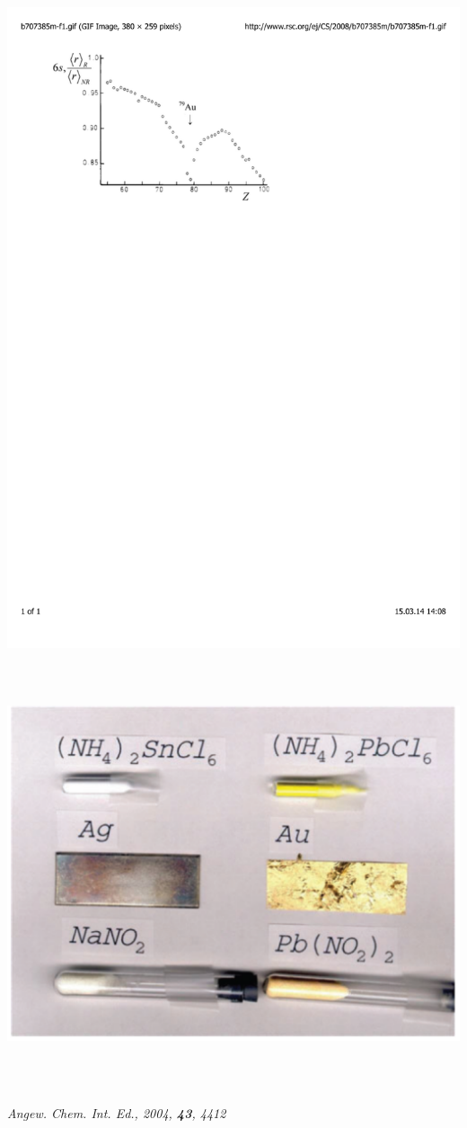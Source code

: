 \documentclass[mathserif,8pt]{beamer}
\begin{document}
\begin{frame}
\begin{columns}
\begin{column}{.45\textwidth}
	\includegraphics[viewport = 50 580 380 780, clip, scale=0.4]{figures/gold_maximum.pdf}\\
	\ \\
	\ \\
	\ \ \includegraphics[viewport = 0 0 800 550, clip, scale=0.15]{figures/gold.pdf}
    \end{column}
    \end{columns}
    \ \\
    \ \\
    \scriptsize{\it{Angew. Chem. Int. Ed.}, 2004, \textbf{43}, 4412}
\end{frame}
\end{document}
